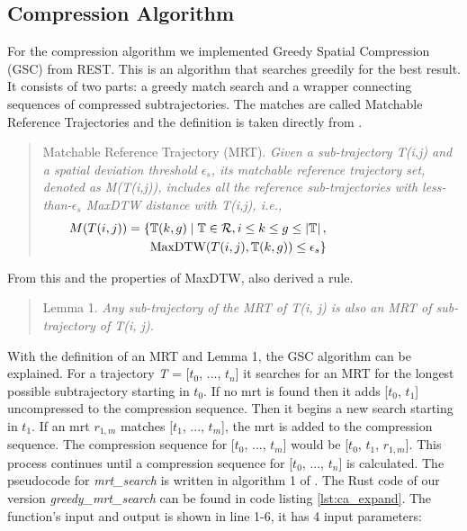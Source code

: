 \subsection{Compression Algorithm}
For the compression algorithm we implemented Greedy Spatial Compression \break (GSC) from REST. This is an algorithm that searches greedily for the best result. It consists of two parts: a greedy match search and a wrapper connecting sequences of compressed subtrajectories.
The matches are called Matchable Reference Trajectories and the definition is taken directly from \textcite{zhao2018rest}.
\begin{quote}
    \begin{definition}
        \label{def:mrt}
        Matchable Reference Trajectory (MRT). \textit{Given a sub-trajectory T(i,j) and a spatial deviation threshold $\epsilon_{s}$, its matchable reference trajectory set, denoted as M(T(i,j)), includes all the reference sub-trajectories with less-than-$\epsilon_{s}$ MaxDTW distance with T(i,j), i.e.,}
        \begin{align*}
            \hspace*{-3cm} M(T(i,j)) = \{ & \mathbb{T}(k,g) \mid \mathbb{T} \in \mathcal{R}, i \leq k \leq g \leq \left\lvert \mathbb{T} \right\rvert, \\
            \hspace*{-3cm}                & \text{MaxDTW}(T(i,j), \mathbb{T}(k,g)) \leq \epsilon_{s} \}
        \end{align*}
    \end{definition}
\end{quote}
From this and the properties of MaxDTW, \textcite{zhao2018rest} also derived a rule.

\begin{quote}
    \label{lemma}
    Lemma 1. \textit{Any sub-trajectory of the MRT of T(i, j) is also an MRT of sub-trajectory of T(i, j).}
\end{quote}

With the definition of an MRT and Lemma 1, the GSC algorithm can be explained.
For a trajectory \textit{T} = [$t_0$, ..., $t_n$] it searches for an MRT for the longest possible subtrajectory starting in $t_0$. If no \acrshort{mrt} is found then it adds [$t_0$, $t_1$] uncompressed to the compression sequence. Then it begins a new search starting in $t_1$. If an \acrshort{mrt} $r_{1,m}$ matches [$t_1$, ..., $t_m$], the \acrshort{mrt} is added to the compression sequence. The compression sequence for [$t_0$, ..., $t_m$] would be [$t_0$, $t_1$, $r_{1,m}$]. This process continues until a compression sequence for [$t_0$, ..., $t_n$] is calculated. The pseudocode for \textit{mrt\_search} is written in algorithm 1 of \textcite{zhao2018rest}. The Rust code of our version \textit{greedy\_mrt\_search} can be found in code listing \ref{lst:ca_expand}. The function's input and output is shown in line 1-6, it has 4 input parameters:

